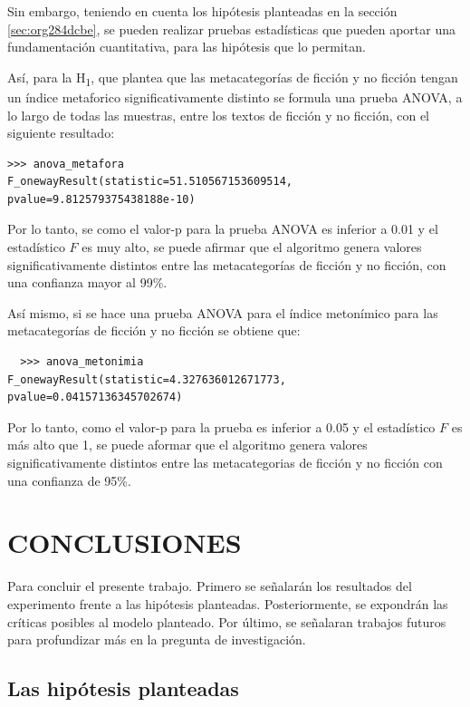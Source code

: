 \documentclass[12pt,letterpaper,twoside]{article}
\begin{document}
Sin embargo, teniendo en cuenta los hipótesis planteadas en la sección \ref{sec:org284dcbe},
se pueden realizar pruebas estadísticas que pueden aportar una fundamentación cuantitativa,
para las hipótesis que lo permitan.

Así, para la H\textsubscript{1}, que plantea que las metacategorías de ficción y no ficción tengan un
índice metaforico significativamente distinto se formula una prueba ANOVA, a lo largo de
todas las muestras, entre los textos de ficción y no ficción, con el siguiente resultado:

\begin{verbatim}
>>> anova_metafora
F_onewayResult(statistic=51.510567153609514, pvalue=9.812579375438188e-10)

\end{verbatim}

Por lo tanto, se como el valor-p para la prueba ANOVA es inferior a 0.01 y
el estadístico \(F\) es muy alto, se puede afirmar que el algoritmo genera valores
significativamente distintos entre las metacategorías de ficción y no ficción,
con una confianza mayor al 99\%.

Así mismo, si se hace una prueba ANOVA para el índice metonímico para las
metacategorías de ficción y no ficción se obtiene que:


\begin{verbatim}
  >>> anova_metonimia
F_onewayResult(statistic=4.327636012671773, pvalue=0.04157136345702674)

\end{verbatim}

Por lo tanto, como el valor-p para la prueba es inferior a 0.05 y el estadístico
\(F\) es más alto que 1, se puede aformar que el algoritmo genera valores
significativamente distintos entre las metacategorias de ficción y no ficción
con una confianza de 95\%.


\section{CONCLUSIONES}
\label{sec:orgdc972ae}

Para concluir el presente trabajo. Primero se señalarán los
resultados del experimento frente a las hipótesis planteadas.
Posteriormente, se expondrán las críticas posibles al modelo
planteado. Por último, se señalaran trabajos futuros para profundizar
más en la pregunta de investigación.

\subsection{Las hipótesis planteadas}
\label{sec:org31c6adf}
\end{document}
